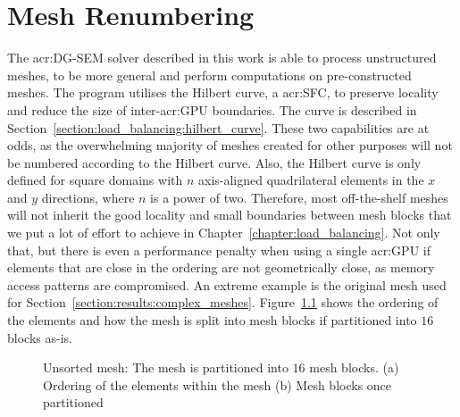 \chapter{Mesh Renumbering}\label{chapter:renumbering}

The \acrshort{acr:DG-SEM} solver described in this work is able to process unstructured meshes, to
be more general and perform computations on pre-constructed meshes. The program utilises the Hilbert
curve, a \acrlong{acr:SFC}, to preserve locality and reduce the size of inter-\acrshort{acr:GPU}
boundaries. The curve is described in Section~\ref{section:load_balancing:hilbert_curve}. These two
capabilities are at odds, as the overwhelming majority of meshes created for other purposes will not
be numbered according to the Hilbert curve. Also, the Hilbert curve is only defined for square
domains with \(n\) axis-aligned quadrilateral elements in the \(x\) and \(y\) directions, where
\(n\) is a power of two. Therefore, most off-the-shelf meshes will not inherit the good locality and
small boundaries between mesh blocks that we put a lot of effort to achieve in
Chapter~\ref{chapter:load_balancing}. Not only that, but there is even a performance penalty when
using a single \acrshort{acr:GPU} if elements that are close in the ordering are not geometrically
close, as memory access patterns are compromised. An extreme example is the original mesh used for
Section~\ref{section:results:complex_meshes}. Figure~\ref{fig:mesh_unsorted} shows the ordering of
the elements and how the mesh is split into mesh blocks if partitioned into \(16\) blocks as-is. 

\begin{figure}[H]
    \centering
    \caption{Unsorted mesh: The mesh is partitioned into \(16\) mesh blocks. (a) Ordering of the elements within the mesh (b) Mesh blocks once partitioned}\label{fig:mesh_unsorted}
\end{figure}

